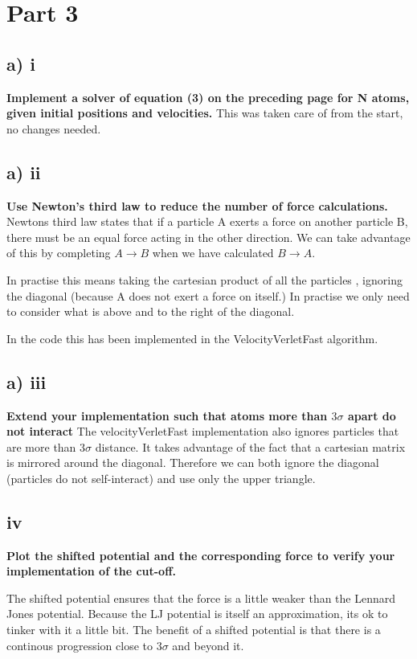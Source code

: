 
\section*{Part 3}

\subsection*{a) i}
\textbf{Implement a solver of equation (3) on the preceding page for N atoms, given initial positions
and velocities.
}
This was taken care of from the start, no changes needed.

\subsection*{a) ii}
\textbf{Use Newton’s third law to reduce the number of force calculations.
}
Newtons third law states that if a particle A exerts a force on another particle B, there must be an equal force acting in the other direction. We can take advantage of this by completing $A \rightarrow B$ when we have calculated $B \rightarrow A$.

In practise this means taking the cartesian product of all the particles , ignoring the diagonal (because A does not exert a force on itself.) In practise we only need to consider what is above and to the right of the diagonal.

In the code this has been implemented in the VelocityVerletFast algorithm. 


\subsection*{a) iii}
\textbf{Extend your implementation such that atoms more than $3\sigma$ apart do not interact}
The velocityVerletFast implementation also ignores particles that are more than $3 \sigma$ distance. It takes advantage of the fact that a cartesian matrix is mirrored around the diagonal. Therefore we can both ignore the diagonal (particles do not self-interact) and use only the upper triangle.


\subsection*{iv}
\textbf{Plot the shifted potential and the corresponding force to verify your implementation of the
cut-off.}

The shifted potential ensures that the force is a little weaker than the Lennard Jones potential. Because the LJ potential is itself an approximation, its ok to tinker with it a little bit. The benefit of a shifted potential is that there is a continous progression close to $3 \sigma $ and beyond it.

